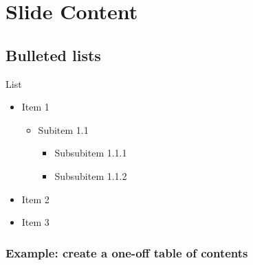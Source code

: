 \documentclass[aspectratio=169, 12pt]{beamer}    %
\begin{document}
\section{Slide Content}



\subsection{Bulleted lists}
\begin{frame}{List}
    \begin{itemize}
        \item Item 1
        \begin{itemize}
            \item Subitem 1.1
            \begin{itemize}
                \item Subsubitem  1.1.1
                \item Subsubitem 1.1.2
            \end{itemize}
        \end{itemize}
        \item Item 2 
        \item Item 3
    \end{itemize}
\end{frame}



\begin{sectionframe}
    \frametitle{Example: create a one-off table of contents}
    \setlength{\parskip}{0ex}
\tableofcontents[ 
    	currentsubsection, 
        sectionstyle=show/shaded, 
        subsectionstyle=show/show/hide,
    ] 
    

 
\end{sectionframe}
\end{document}
